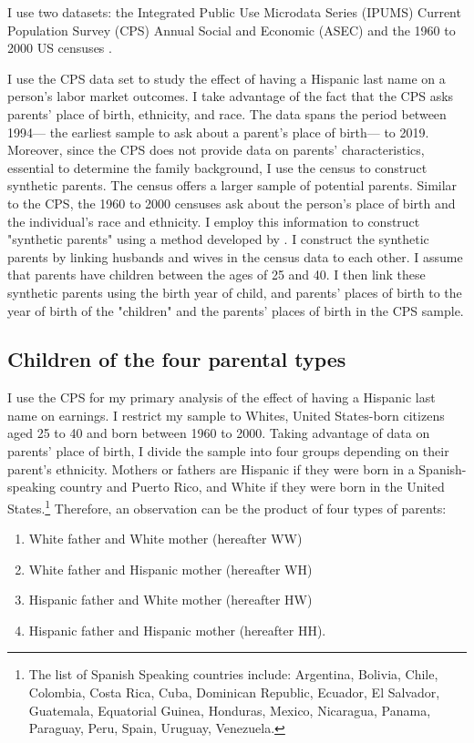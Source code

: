I use two datasets:  the Integrated Public Use Microdata Series (IPUMS) Current Population Survey (CPS) Annual Social and Economic (ASEC) \autocite{cps2019} and the 1960 to 2000 US censuses \autocite{acs2019}. 

I use the CPS data set to study the effect of having a Hispanic last name on a person's labor market outcomes. I take advantage of the fact that the CPS asks parents' place of birth, ethnicity, and race. The data spans the period between 1994--- the earliest sample to ask about a parent's place of birth--- to 2019. Moreover, since the CPS does not provide data on parents' characteristics, essential to determine the family background, I use the census to construct synthetic parents. The census offers a larger sample of potential parents. Similar to the CPS, the 1960 to 2000 censuses ask about the person's place of birth and the individual's race and ethnicity. I employ this information to construct "synthetic parents" using a method developed by \textcite{rubinstein2014pride}. I construct the synthetic parents by linking husbands and wives in the census data to each other. I assume that parents have children between the ages of 25 and 40. I then link these synthetic parents using the birth year of child, and parents' places of birth to the year of birth of the "children" and the parents' places of birth in the CPS sample.

\subsection{Children of the four parental types}

I use the CPS for my primary analysis of the effect of having a Hispanic last name on earnings. I restrict my sample to Whites, United States-born citizens aged 25 to 40 and born between 1960 to 2000. Taking advantage of data on parents' place of birth, I divide the sample into four groups depending on their parent's ethnicity. Mothers or fathers are Hispanic if they were born in a Spanish-speaking country and Puerto Rico, and White if they were born in the United States.\footnote{The list of Spanish Speaking countries include: Argentina, Bolivia, Chile, Colombia, Costa Rica, Cuba, Dominican Republic, Ecuador, El Salvador, Guatemala, Equatorial Guinea, Honduras, Mexico, Nicaragua, Panama, Paraguay, Peru, Spain, Uruguay, Venezuela.} Therefore, an observation can be the product of four types of parents: 
\begin{enumerate}
\item White father and White mother (hereafter WW) 
\item White father and Hispanic mother (hereafter WH)
\item Hispanic father and White mother (hereafter HW)
\item Hispanic father and Hispanic mother (hereafter HH).
\end{enumerate}

